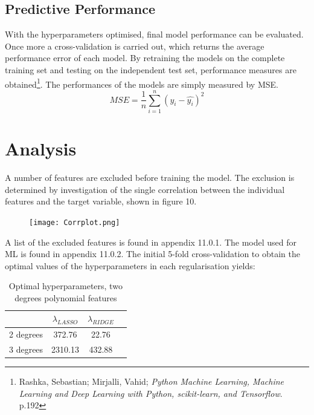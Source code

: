 \documentclass[12pt,a4paper]{article}
\begin{document}
\subsection{Predictive Performance}
With the hyperparameters optimised, final model performance can be evaluated. Once more a cross-validation is carried out, which returns the average performance error of each model. By retraining the models on the complete training set and testing on the independent test set, performance measures are obtained\footnote{Rashka, Sebastian; Mirjalli, Vahid; \textit{Python Machine Learning, Machine Learning and Deep Learning with Python, scikit-learn, and Tensorflow}. p.192}. \newline The performances of the models are simply measured by MSE. \newline
$$ MSE = \frac{1}{n}\sum_{i=1}^{n}(y_i-\hat{y_i})^2$$



\section{Analysis}
A number of features are excluded before training the model. The exclusion is determined by investigation of the single correlation between the  individual features and the target variable, shown in figure 10.
\begin{figure}[H]
\centering
\caption{}
\texttt{[image: Corrplot.png]}
\end{figure}

A list of the excluded features is found in appendix 11.0.1. The model used for ML is found in appendix 11.0.2.  
The initial 5-fold cross-validation to obtain the optimal values of the hyperparameters in each regularisation yields: 
\begin{table}[H]
\begin{center}
\caption{Optimal hyperparameters, two degrees polynomial features\label{time}}
\begin{tabular}{ c | c  c  c } 
  & $\lambda_{LASSO}$ & $\lambda_{RIDGE}$ \\ \hline
2 degrees  & 372.76 & 22.76 \\ \hline
3 degrees  & 2310.13 & 432.88
\end{tabular}
\end{center}
\end{table} 
\end{document}
